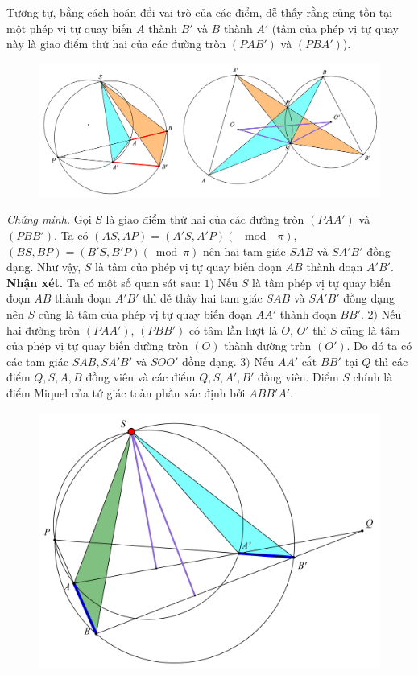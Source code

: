 \begin{multicols}{2}
	\vskip 0.1cm
	Tương tự, bằng cách hoán đổi vai trò của các điểm, dễ thấy rằng cũng tồn tại một phép vị tự quay biến $A$ thành $B'$ và $B$ thành $A'$ (tâm của phép vị tự quay này là giao điểm thứ hai của các đường tròn $(PAB')$ và $(PBA')$).
	\begin{figure}[H]
		\vspace*{-5pt}
		\centering
		\captionsetup{labelformat= empty, justification=centering}
		\includegraphics[width=1\linewidth]{2}
		\vspace*{-20pt}
	\end{figure}
	\textit{Chứng minh.} Gọi $S$ là giao điểm thứ hai của các đường tròn $(PAA')$ và $(PBB')$. Ta có $(AS,AP)=(A'S,A'P) (\,\,\bmod \,\,\, \pi)$, $(BS,BP)=(B'S,B'P)(\bmod  \pi)$ nên hai tam giác $SAB$ và $SA'B'$ đồng dạng. Như vậy, $S$ là tâm của phép vị tự quay biến đoạn $AB$ thành đoạn $A'B'$. 
	\vskip 0.1cm
	\textbf{\color{hoccungpi}Nhận xét.}  Ta có một số quan sát sau:
	\vskip 0.1cm
	$1)$ Nếu $S$ là tâm phép vị tự quay biến đoạn $AB$ thành đoạn $A'B'$ thì dễ thấy hai tam giác $SAB$ và $SA'B'$ đồng dạng nên $S$ cũng là tâm của phép vị tự quay biến đoạn $AA'$ thành đoạn $BB'$.
	\vskip 0.1cm 
	$2)$ Nếu hai đường tròn $(PAA')$, $(PBB')$  có tâm lần lượt là $O$, $O'$ thì $S$ cũng là tâm của phép vị tự quay biến đường tròn $(O)$ thành đường tròn $(O')$. Do đó ta có các tam giác $SAB,SA'B'$ và $SOO'$ đồng dạng.
	\vskip 0.1cm
	$3)$ Nếu $AA'$ cắt $BB'$ tại $Q$ thì các điểm $Q,S,A,B$ đồng viên và các điểm $Q,S,A',B'$ đồng viên. Điểm $S$ chính là điểm Miquel của tứ giác toàn phần xác định bởi $ABB'A'$.
	\begin{figure}[H]
		\vspace*{-5pt}
		\centering
		\captionsetup{labelformat= empty, justification=centering}
		\includegraphics[scale=0.75]{3}

\end{figure}
\end{multicols}
